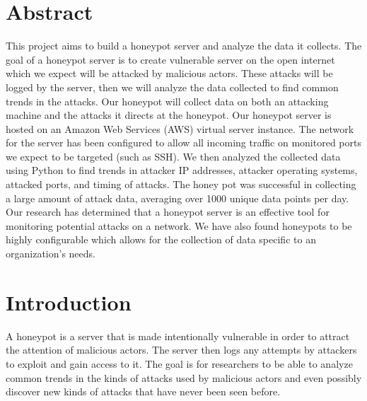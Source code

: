 \documentclass[a0,landscape]{a0poster}
\begin{document}
\begin{multicols}{3} %


\color{Black} %

\section*{Abstract}

This project aims to build a honeypot server and analyze the data it collects. The goal of a honeypot server is to create vulnerable server on the open internet which we expect will be attacked by malicious actors. These attacks will be logged by the server, then we will analyze the data collected to find common trends in the attacks. Our honeypot will collect data on both an attacking machine and the attacks it directs at the honeypot. Our honeypot server is hosted on an Amazon Web Services (AWS) virtual server instance. The network for the server has been configured to allow all incoming traffic on monitored ports we expect to be targeted (such as SSH). We then analyzed the collected data using Python to find trends in attacker IP addresses, attacker operating systems, attacked ports, and timing of attacks. The honey pot was successful in collecting a large amount of attack data, averaging over 1000 unique data points per day. Our research has determined that a honeypot server is an effective tool for monitoring potential attacks on a network. We have also found honeypots to be highly configurable which allows for the collection of data specific to an organization's needs. 


\section*{Introduction}

A honeypot is a server that is made intentionally vulnerable in order to attract the attention of malicious actors. The server then logs any attempts by attackers to exploit and gain access to it. The goal is for researchers to be able to analyze common trends in the kinds of attacks used by malicious actors and even possibly discover new kinds of attacks that have never been seen before.  


\end{multicols}
\end{document}
